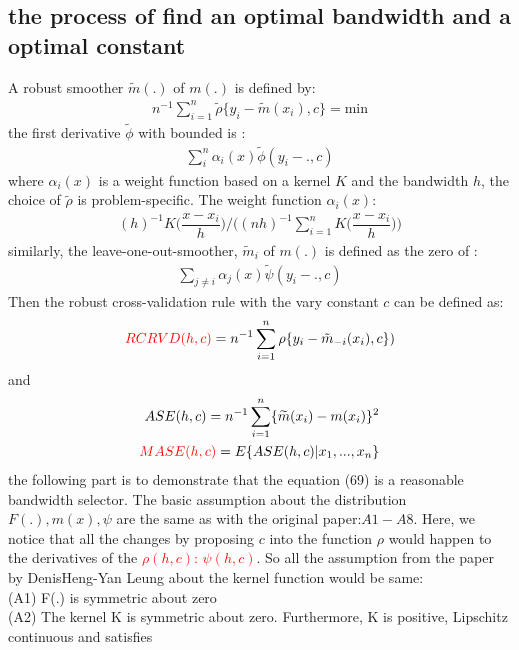 \documentclass[12pt]{amsart}
\begin{document}
\subsection{the process of find an optimal bandwidth and a optimal constant}
A robust smoother $\tilde{m}(.)$ of $m(.)$ is defined by:
\begin{align}
n^{-1}\sum^{n}_{i=1}\tilde{\rho}\{y_{i}-\tilde{m}(x_{i}),c\}=\text{min}
\end{align}
the first derivative $\tilde{\phi}$ with bounded is :
\begin{align}
\sum^{n}_{i}\alpha_{i}(x)\tilde{\phi}(y_{i}-.,c)
\end{align}
where $\alpha_{i}(x)$ is a weight function based on a kernel $K$ and the bandwidth $h$, the choice of $\tilde{\rho}$ is problem-specific. The weight function $\alpha_{i}(x)$:
\begin{align}
(h)^{-1}K\bigg(\dfrac{x-x_{i}}{h}\bigg)\bigg/\bigg((nh)^{-1}\sum^{n}_{i=1}K\bigg(\dfrac{x-x_{i}}{h}\bigg)\bigg)\nonumber
\end{align}
similarly, the leave-one-out-smoother, $\tilde{m}_{i}$ of $m(.)$ is defined as the zero of :
\begin{align}
\sum_{j\neq i} \alpha_{j}(x)\tilde{\psi}(y_{i}-.,c)\nonumber
\end{align}
Then the robust cross-validation rule with the vary constant $c$ can be defined as:
\begin{align}
\textcolor{red}{RCRVD(h,c)}=n^{-1}\sum_{i=1}^{n}\rho\{y_{i}-\tilde{m}_{-i}(x_{i}),c\})
\end{align}
and 
\begin{align}
ASE(h,c)=n^{-1}\sum_{i=1}^{n}\{\widetilde{m}(x_{i})-m(x_{i})\}^{2}\nonumber\\
\textcolor{red}{MASE(h,c)}=E\{ASE(h,c)|x_{1},...,x_{n}\}\nonumber
\end{align}
the following part is to demonstrate that the equation (69) is a reasonable bandwidth selector.
The basic assumption about the distribution $F(.),m(x),\psi$ are the same as with the original paper:$A1-A8$.
Here, we notice that all the changes by proposing $c$ into the function $\rho$ would happen to the derivatives of the \textcolor{red} {$\rho(h,c)$: $\psi(h,c)$}. So all the assumption from the paper by DenisHeng-Yan Leung about the kernel function would be same:\\
(A1) F(.)  is symmetric about zero\\
(A2) The kernel  K  is symmetric about zero. Furthermore, K is positive, Lipschitz
continuous and satisfies
\end{document}
